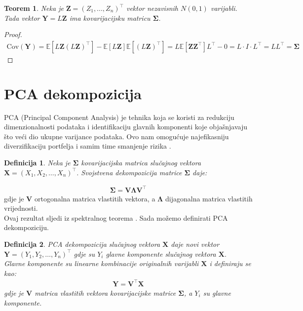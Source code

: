 \documentclass[zavrsnirad, upload]{fer}
\newtheorem{definition}{Definicija}
\newtheorem{theorem}{Teorem}
\newtheorem{proof}{Dokaz}
\begin{document}
\begin{theorem}
Neka je $\mathbf{Z} = (Z_1, ..., Z_n)^\intercal$ vektor nezavisnih $N(0,1)$ varijabli. Tada vektor $\mathbf{Y} = L\mathbf{Z}$ ima kovarijacijsku matricu $\boldsymbol{\Sigma}$.
\end{theorem}
\begin{proof}
\begin{align}
\text{Cov}(\mathbf{Y}) = \mathbb{E}[L\mathbf{Z}(L\mathbf{Z})^\intercal] -
    \mathbb{E}[L\mathbf{Z}]\mathbb{E}[(L\mathbf{Z})^\intercal]
    = L\mathbb{E}[\mathbf{Z}\mathbf{Z}^\intercal]L^\intercal - 0
    = L \cdot I \cdot L^\intercal = LL^\intercal = \boldsymbol{\Sigma}
\end{align}
\end{proof}

\section{PCA dekompozicija}
\label{sek:pca}
PCA (Principal Component Analysis) je tehnika koja se koristi za
redukciju dimenzionalnosti podataka i identifikaciju glavnih komponenti koje
objašnjavaju što veći dio ukupne varijance podataka. Ovo nam omogućuje
najefikasniju diverzifikaciju portfelja i samim time smanjenje
rizika \cite{Investments}.

\begin{definition}
    Neka je $\boldsymbol{\Sigma}$ kovarijacijska matrica slučajnog
    vektora $\mathbf{X} = (X_1, X_2, \dots, X_n)^\intercal$.
    Svojstvena dekompozicija matrice
    $\boldsymbol{\Sigma}$ daje:
\end{definition}
\begin{align}
    \boldsymbol{\Sigma} = \boldsymbol{V} \boldsymbol{\Lambda} \boldsymbol{V}^\intercal
\end{align}
\indent gdje je $\boldsymbol{V}$ ortogonalna matrica vlastitih vektora, a
$\boldsymbol{\Lambda}$
dijagonalna matrica vlastitih vrijednosti.\\

\noindent Ovaj rezultat sljedi iz spektralnog teorema \cite{NumerickaLinearna}.
Sada možemo definirati PCA dekompoziciju.
\begin{definition}
    PCA dekompozicija slučajnog vektora $\mathbf{X}$ daje novi vektor
    $\mathbf{Y} = (Y_1, Y_2, \dots, Y_n)^\intercal$ gdje su $Y_i$
    glavne komponente slučajnog vektora $\mathbf{X}$.\\
    Glavne komponente su linearne kombinacije originalnih varijabli
    $\mathbf{X}$ i definiraju se kao:
    \begin{align}
        \mathbf{Y} = \boldsymbol{V}^\intercal \mathbf{X}
    \end{align}
    \indent gdje je $\boldsymbol{V}$ matrica vlastitih vektora kovarijacijske
    matrice $\boldsymbol{\Sigma}$, a $Y_i$ su glavne komponente.
\end{definition}
\end{document}
